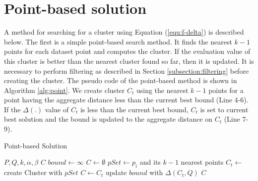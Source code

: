\documentclass[a4paper,11pt]{report}
\theoremstyle{mytheoremstyle}
\begin{document}
\section{Point-based solution}

A method for searching for a cluster using Equation (\ref{equ:f-delta}) is described below. The first is a simple point-based search method. It finds the nearest $k-1$ points for each dataset point and computes the cluster. If the evaluation value of this cluster is better than the nearest cluster found so far, then it is updated. It is necessary to perform filtering as described in Section \ref{subsection:filtering} before creating the cluster. The pseudo code of the point-based method is shown in Algorithm \ref{alg:point}. We create cluster $C_t$ using the nearest $k-1$ points for a point having the aggregate distance less than the current best bound (Line 4-6). If the $\Delta(.)$ value of $C_t$ is less than the current best bound, $C_t$ is set to current best solution and the bound is updated to the aggregate distance on $C_t$ (Line 7-9).

\begin{algorithm}                      
\caption{Point-based Solution}         
\label{alg:point}
\begin{algorithmic}[1]                  
\renewcommand{\algorithmicrequire}{\textbf{Input:}}
\renewcommand{\algorithmicensure}{\textbf{Output:}}
\REQUIRE $P,Q,k,\alpha, \beta$
\ENSURE $C$
\STATE $bound \xleftarrow{} \infty$
\STATE $C \xleftarrow{} \emptyset$
\STATE $pSet \xleftarrow{} p_i$ and its $k-1$ nearest points
\STATE $C_t \xleftarrow{}$ create Cluster with $pSet$
\STATE $C \xleftarrow{} C_t$
\STATE update $bound$ with $\Delta(C_t,Q)$
\ENDIF
\ENDIF
\ENDFOR
\RETURN $C$
\end{algorithmic}
\end{algorithm}
\end{document}
